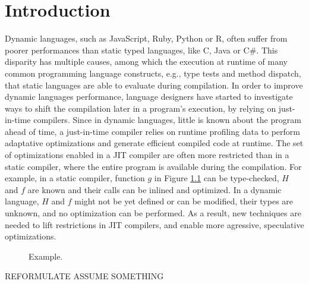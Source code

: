 
\chapter{Introduction} %

\label{Chapter1} %


\newcommand{\keyword}[1]{\textbf{#1}}
\newcommand{\tabhead}[1]{\textbf{#1}}
\newcommand{\code}[1]{\texttt{#1}}
\newcommand{\file}[1]{\texttt{\bfseries#1}}
\newcommand{\option}[1]{\texttt{\itshape#1}}


Dynamic languages, such as JavaScript, Ruby, Python or R, often suffer from poorer performances than static typed languages, like C, Java or C\#.
This disparity has multiple causes, among which the execution at runtime of many common programming language constructs, e.g., type tests and method dispatch, that static languages are able to evaluate during compilation.
In order to improve dynamic languages performance, language designers have started to investigate ways to shift the compilation later in a program's execution, by relying on just-in-time compilers.
Since in dynamic languages, little is known about the program ahead of time, a just-in-time compiler relies on runtime profiling data to perform adaptative optimizations and generate efficient compiled code at runtime.
The set of optimizations enabled in a JIT compiler are often more restricted than in a static compiler, where the entire program is available during the compilation.
For example, in a static compiler, function $g$ in Figure \ref{fig:example} can be type-checked, $H$ and $f$ are known and their calls can be inlined and optimized.
In a dynamic language, $H$ and $f$ might not be yet defined or can be modified, their types are unknown, and no optimization can be performed.
As a result, new techniques are needed to lift restrictions in JIT compilers, and enable more agressive, speculative optimizations.\\

\begin{figure}[h]
\caption{Example.}
\label{fig:example}
\end{figure}
REFORMULATE ASSUME SOMETHING\\

